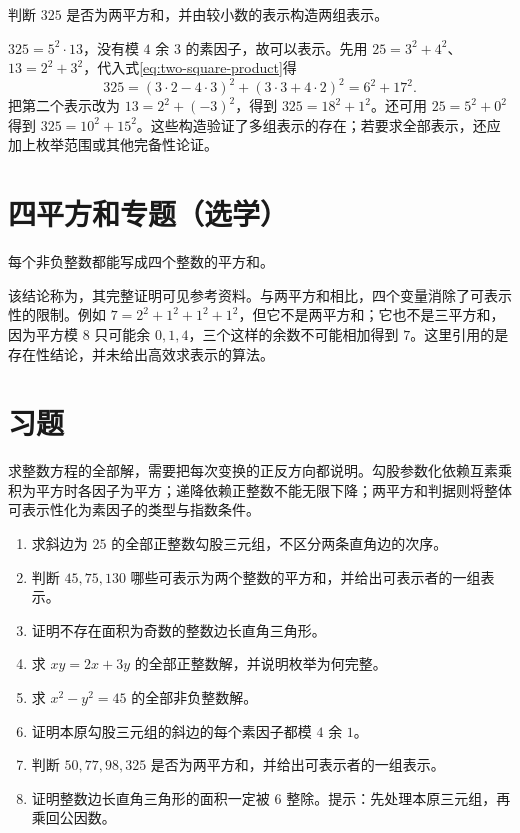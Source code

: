 \documentclass[UTF8,12pt,a4paper,fontset=fandol]{ctexbook}
\begin{document}
\begin{example}[从判据走向构造]
判断 $325$ 是否为两平方和，并由较小数的表示构造两组表示。
\end{example}
\begin{solve}
$325=5^2\cdot13$，没有模 $4$ 余 $3$ 的素因子，故可以表示。先用 $25=3^2+4^2$、$13=2^2+3^2$，代入式\eqref{eq:two-square-product}得
\[
 325=(3\cdot2-4\cdot3)^2+(3\cdot3+4\cdot2)^2=6^2+17^2.
\]
把第二个表示改为 $13=2^2+(-3)^2$，得到 $325=18^2+1^2$。还可用 $25=5^2+0^2$ 得到 $325=10^2+15^2$。这些构造验证了多组表示的存在；若要求全部表示，还应加上枚举范围或其他完备性论证。
\end{solve}

\section{四平方和专题（选学）}

\begin{theorem}
每个非负整数都能写成四个整数的平方和。
\end{theorem}

该结论称为，其完整证明可见参考资料\cite{mit-four-squares}。与两平方和相比，四个变量消除了可表示性的限制。例如 $7=2^2+1^2+1^2+1^2$，但它不是两平方和；它也不是三平方和，因为平方模 $8$ 只可能余 $0,1,4$，三个这样的余数不可能相加得到 $7$。这里引用的是存在性结论，并未给出高效求表示的算法。

\section{习题}

求整数方程的全部解，需要把每次变换的正反方向都说明。勾股参数化依赖互素乘积为平方时各因子为平方；递降依赖正整数不能无限下降；两平方和判据则将整体可表示性化为素因子的类型与指数条件。

\begin{enumerate}
 \item 求斜边为 $25$ 的全部正整数勾股三元组，不区分两条直角边的次序。
 \item 判断 $45,75,130$ 哪些可表示为两个整数的平方和，并给出可表示者的一组表示。
 \item 证明不存在面积为奇数的整数边长直角三角形。
 \item 求 $xy=2x+3y$ 的全部正整数解，并说明枚举为何完整。
 \item\label{ex:dio-factors} 求 $x^2-y^2=45$ 的全部非负整数解。
 \item\label{ex:dio-hypotenuse} 证明本原勾股三元组的斜边的每个素因子都模 $4$ 余 $1$。
 \item\label{ex:dio-two-square-list} 判断 $50,77,98,325$ 是否为两平方和，并给出可表示者的一组表示。
 \item\label{ex:dio-area} 证明整数边长直角三角形的面积一定被 $6$ 整除。提示：先处理本原三元组，再乘回公因数。
\end{enumerate}
\end{document}
